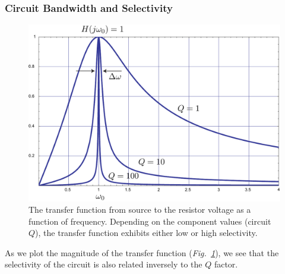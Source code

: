 \subsubsection{Circuit Bandwidth and Selectivity}
\begin{figure}[t]
\centering
\includegraphics[width=.65\columnwidth]{transferrlc}
\caption{The transfer function from source to the resistor voltage as a function of frequency.  Depending on the component values (circuit $Q$), the transfer function exhibits either low or high selectivity.} \label{fig:transferrlc}
\end{figure}
As we plot the magnitude of the transfer function (\emph{Fig.~\ref{fig:transferrlc}}), we see that the selectivity of the circuit is also related inversely to the $Q$ factor.  

